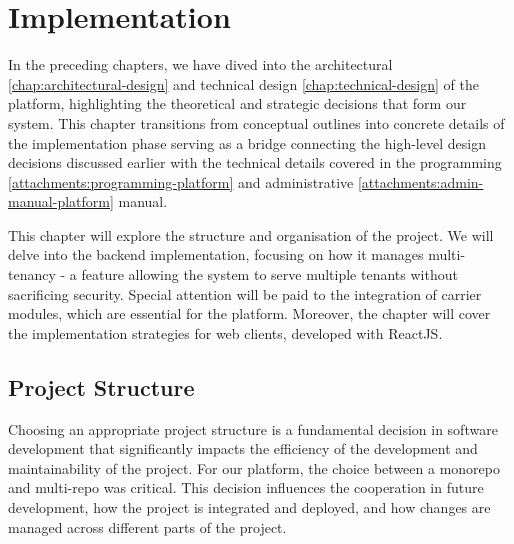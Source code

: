 \chapter{Implementation}
\label{chap:implementation}

In the preceding chapters, we have dived into the architectural \ref{chap:architectural-design} and technical design \ref{chap:technical-design} of the platform, highlighting the theoretical and strategic decisions that form our system.
This chapter transitions from conceptual outlines into concrete details of the implementation phase serving as a bridge connecting the high-level design decisions discussed earlier with the technical details covered in the programming \ref{attachments:programming-platform} and administrative \ref{attachments:admin-manual-platform} manual.

This chapter will explore the structure and organisation of the project.
We will delve into the backend implementation, focusing on how it manages multi-tenancy - a feature allowing the system to serve multiple tenants without sacrificing security.
Special attention will be paid to the integration of carrier modules, which are essential for the platform.
Moreover, the chapter will cover the implementation strategies for web clients, developed with ReactJS.


\section{Project Structure}
\label{sec:project-structure}


Choosing an appropriate project structure is a fundamental decision in software development that significantly impacts the efficiency of the development and maintainability of the project.
For our platform, the choice between a \ac{monorepo} and \ac{multi-repo} was critical.
This decision influences the cooperation in future development, how the project is integrated and deployed, and how changes are managed across different parts of the project.


